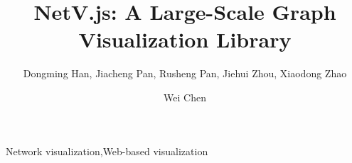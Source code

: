 \documentclass[5p]{elsarticle}
\newcommand{\name}{NetV.js\xspace}
\begin{document}
\begin{CJK}{UTF8}{gbsn}
\begin{frontmatter}

\title{\name: A Large-Scale Graph Visualization Library}

\author[mymainaddress,mysecondaryaddress]{Dongming Han, Jiacheng Pan, Rusheng Pan, Jiehui Zhou, Xiaodong Zhao}
\author[mymainaddress]{Wei Chen}

\address[mymainaddress]{State Key Lab of CAD\&CG, Zhejiang University, Hangzhou, Zhejiang, China}
\address[mysecondaryaddress]{Zhejiang Lab, hangzhou, zhejiang, China}

\begin{abstract}
    
\end{abstract}

\begin{keyword}
Network visualization\sep Web-based visualization
\end{keyword}

\end{frontmatter}

\linenumbers










\end{CJK}
\end{document}
